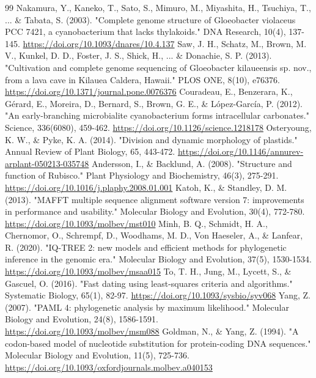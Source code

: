 \documentclass[10pt,letterpaper]{article}
\begin{document}
\begin{thebibliography}{99}
 Nakamura, Y., Kaneko, T., Sato, S., Mimuro, M., Miyashita, H., Tsuchiya, T., ... \& Tabata, S. (2003). "Complete genome structure of Gloeobacter violaceus PCC 7421, a cyanobacterium that lacks thylakoids." DNA Research, 10(4), 137-145. \url{https://doi.org/10.1093/dnares/10.4.137}
 Saw, J. H., Schatz, M., Brown, M. V., Kunkel, D. D., Foster, J. S., Shick, H., ... \& Donachie, S. P. (2013). "Cultivation and complete genome sequencing of Gloeobacter kilaueensis sp. nov., from a lava cave in Kilauea Caldera, Hawaii." PLOS ONE, 8(10), e76376. \url{https://doi.org/10.1371/journal.pone.0076376}
 Couradeau, E., Benzerara, K., Gérard, E., Moreira, D., Bernard, S., Brown, G. E., \& López-García, P. (2012). "An early-branching microbialite cyanobacterium forms intracellular carbonates." Science, 336(6080), 459-462. \url{https://doi.org/10.1126/science.1218178}
 Osteryoung, K. W., \& Pyke, K. A. (2014). "Division and dynamic morphology of plastids." Annual Review of Plant Biology, 65, 443-472. \url{https://doi.org/10.1146/annurev-arplant-050213-035748}
 Andersson, I., \& Backlund, A. (2008). "Structure and function of Rubisco." Plant Physiology and Biochemistry, 46(3), 275-291. \url{https://doi.org/10.1016/j.plaphy.2008.01.001}
 Katoh, K., \& Standley, D. M. (2013). "MAFFT multiple sequence alignment software version 7: improvements in performance and usability." Molecular Biology and Evolution, 30(4), 772-780. \url{https://doi.org/10.1093/molbev/mst010}
 Minh, B. Q., Schmidt, H. A., Chernomor, O., Schrempf, D., Woodhams, M. D., Von Haeseler, A., \& Lanfear, R. (2020). "IQ-TREE 2: new models and efficient methods for phylogenetic inference in the genomic era." Molecular Biology and Evolution, 37(5), 1530-1534. \url{https://doi.org/10.1093/molbev/msaa015}
 To, T. H., Jung, M., Lycett, S., \& Gascuel, O. (2016). "Fast dating using least-squares criteria and algorithms." Systematic Biology, 65(1), 82-97. \url{https://doi.org/10.1093/sysbio/syv068}
 Yang, Z. (2007). "PAML 4: phylogenetic analysis by maximum likelihood." Molecular Biology and Evolution, 24(8), 1586-1591. \url{https://doi.org/10.1093/molbev/msm088}
 Goldman, N., \& Yang, Z. (1994). "A codon-based model of nucleotide substitution for protein-coding DNA sequences." Molecular Biology and Evolution, 11(5), 725-736. \url{https://doi.org/10.1093/oxfordjournals.molbev.a040153}
\end{thebibliography}
\end{document}
